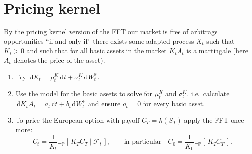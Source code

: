 \documentclass[11pt]{article}
\newcommand{\rd}{\,\mathrm{d}}
\newcommand{\kansp}{\mathbb{P}}
\newcommand{\E}{\mathbb{E}}
\begin{document}
\section{Pricing kernel}
By the pricing kernel version of the FFT our market is free of arbitrage opportunities ``if and only if'' there exists some adapted process $K_t$ such that $K_t>0$ and such that for all basic assets in the market $K_tA_t$ is a martingale (here $A_t$ denotes the price of the asset).
\begin{enumerate}
\item Try $\rd K_t = \mu_t^K \rd t + \sigma_t^K \rd W_t^{\kansp}$.
\item Use the model for the basic assets to solve for $\mu_t^K$ and $\sigma_t^K$, i.e.\ calculate $\rd K_tA_t = a_t\rd t + b_t \rd W_t^{\kansp}$ and ensure $a_t=0$ for every basic asset.
\item To price the European option with payoff $C_T=h(S_T)$ apply the FFT once more:
\[
C_t = \frac{1}{K_t}\E_{\kansp}[\, K_T C_T \mid \mathcal{F}_t\,],
\qquad\text{in particular}\quad
C_0 = \frac{1}{K_0}\E_{\kansp}[\, K_T C_T\,].
\]
\end{enumerate}
\end{document}
